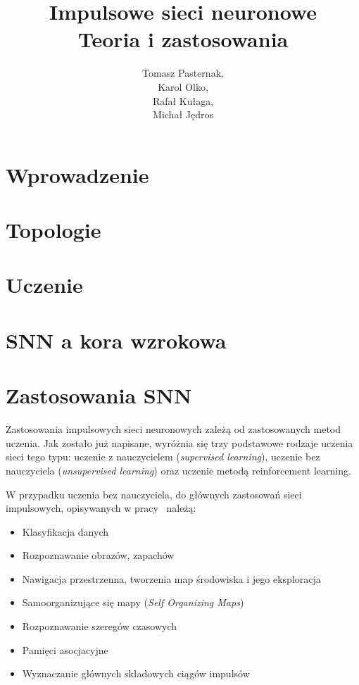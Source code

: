 \documentclass[11pt]{article}
\begin{document}
\author{Tomasz Pasternak, \\
		Karol Olko, \\
		Rafał Kułaga, \\
		Michał Jędros}
\title{\Huge{Impulsowe sieci neuronowe} \\ \vspace{0.2cm} \small{Teoria i zastosowania}}

\maketitle
\newpage{}
\tableofcontents{}
\newpage{}


\newpage{}

\section{Wprowadzenie}

\section{Topologie}

\section{Uczenie}

\section{SNN a kora wzrokowa}

\section{Zastosowania SNN}

Zastosowania impulsowych sieci neuronowych zależą od zastosowanych metod uczenia. Jak zostało już napisane, wyróżnia się trzy podstawowe rodzaje uczenia sieci tego typu: uczenie z nauczycielem (\emph{supervised learning}), uczenie bez nauczyciela (\emph{unsupervised learning}) oraz uczenie metodą reinforcement learning. 

W przypadku uczenia bez nauczyciela, do głównych zastosowań sieci impulsowych, opisywanych w pracy~\cite{Ponulak2011} należą:

\begin{itemize}

\item Klasyfikacja danych
\item Rozpoznawanie obrazów, zapachów
\item Nawigacja przestrzenna, tworzenia map środowiska i jego eksploracja
\item Samoorganizujące się mapy (\emph{Self Organizing Maps})
\item Rozpoznawanie szeregów czasowych
\item Pamięci asocjacyjne
\item Wyznaczanie głównych składowych ciągów impulsów

\end{itemize}
\end{document}
